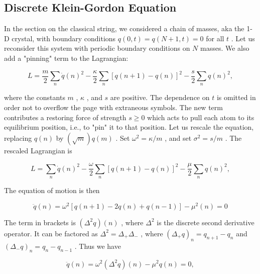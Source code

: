 \subsection{Discrete  Klein-Gordon  Equation}

In  the  section  on  the  classical  string,  we  considered
 a  chain  of  masses,  aka  the  1-D  crystal,  with  boundary  conditions   $q(0,t) = q(N+1,t) = 0$  for  all   $t$ .   Let  us  reconsider  this  system  with  periodic
 boundary  conditions  on   $N$  masses.   We  also  add  a  "pinning"  term  to  the  Lagrangian:



\begin{equation}
\label{crystallagrangian}
L = \frac{m}{2} \sum_n \dot q(n)^2
- \frac{\kappa}{2}\sum_n [q(n+1) - q(n)]^2
- \frac{s}{2}\sum_n q(n)^2,
\end{equation}


where  the  constants   $m$ ,   $\kappa$ ,  and   $s$  are  positive.
 The  dependence  on   $t$  is  omitted  in  order  not  to  overflow  the  page  with  extraneous  symbols.
 The  new  term  contributes  a  restoring  force  of  strength   $s \ge 0$  which  acts  to  pull  each  atom  to  its  equilibrium  position,  i.e.,  to  "pin"  it  to  that  position.   Let  us  rescale  the  equation,  replacing   $q(n)$  by   $(\sqrt m)q(m)$ .   Set   $\omega^2 = \kappa/m$ ,  and  set   $\sigma^2 = s/m$ .   The  rescaled  Lagrangian  is



\begin{equation}
\label{crystallagrangian2}
L = \sum_n \dot q(n)^2
- \frac{\omega}{2}\sum_n [q(n+1) - q(n)]^2
- \frac{\mu}{2}\sum_n q(n)^2,
\end{equation}


The  equation  of  motion  is  then



\begin{equation}
\label{discrete-wave-equation}
\ddot q(n) = \omega^2[q(n+1) - 2q(n) + q(n-1)] - \mu^2(n) = 0
\end{equation}


The  term  in  brackets  is   $(\Delta^2 q)(n)$ ,  where   $\Delta^2$  is  the  discrete  second  derivative  operator.   It  can  be  factored  as   $\Delta^2 = \Delta_+\Delta_-$ ,  where   $(\Delta_+q)_n = q_{n+1} - q_n$  and
  $(\Delta_-q)_n = q_{n} - q_{n-1}$ .   Thus  we  have



\begin{equation}
\label{discrete-wave-equation2}
\ddot q(n) = \omega^2 (\Delta^2 q)(n) - \mu^2 q(n) = 0,
\end{equation}


